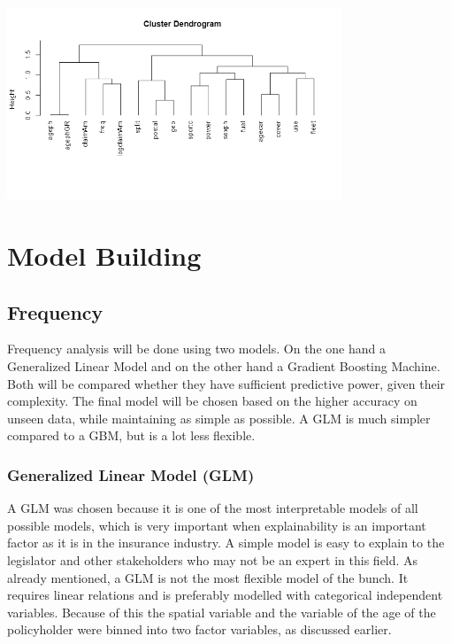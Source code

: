\documentclass[
  12pt,
]{article}
\begin{document}
\includegraphics[width=0.75\textwidth,height=\textheight]{Severity_Analysis/plots/exploratory/dendogram.png}

\hypertarget{model-building}{%
\section{Model Building}\label{model-building}}

\hypertarget{frequency-1}{%
\subsection{Frequency}\label{frequency-1}}

Frequency analysis will be done using two models. On the one hand a
Generalized Linear Model and on the other hand a Gradient Boosting
Machine. Both will be compared whether they have sufficient predictive
power, given their complexity. The final model will be chosen based on
the higher accuracy on unseen data, while maintaining as simple as
possible. A GLM is much simpler compared to a GBM, but is a lot less
flexible.

\hypertarget{generalized-linear-model-glm}{%
\subsubsection{Generalized Linear Model
(GLM)}\label{generalized-linear-model-glm}}

A GLM was chosen because it is one of the most interpretable models of
all possible models, which is very important when explainability is an
important factor as it is in the insurance industry. A simple model is
easy to explain to the legislator and other stakeholders who may not be
an expert in this field. As already mentioned, a GLM is not the most
flexible model of the bunch. It requires linear relations and is
preferably modelled with categorical independent variables. Because of
this the spatial variable and the variable of the age of the
policyholder were binned into two factor variables, as discussed
earlier.
\end{document}
